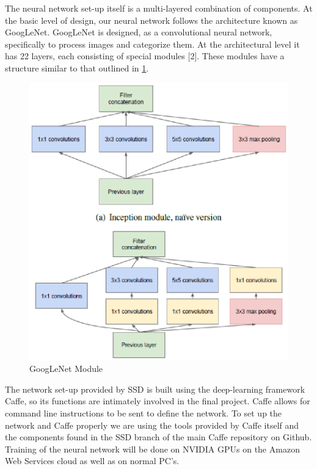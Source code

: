 The neural network set-up itself is a multi-layered combination of components. At the basic level of design, our neural
network follows the architecture known as GoogLeNet. GoogLeNet is designed, as a convolutional neural network,
specifically to process images and categorize them. At the architectural level it has 22 layers, each consisting of special
modules [2]. These modules have a structure similar to that outlined in \ref{fig:4.1}.
\newline
\newline
\begin{figure}
  \includegraphics{GoogLeNetModule.eps}
  \caption{GoogLeNet Module}
  \label{fig:4.1}
\end{figure}The network set-up provided by SSD is built using the deep-learning framework Caffe, so its functions are intimately involved in the final project.
Caffe allows for command line instructions to be sent to define the network.
To set up the network and Caffe properly we are using the tools provided by Caffe itself and the components found in the SSD branch of the main Caffe repository on Github.
\newline
\newline
Training of the neural network will be done on NVIDIA GPUs on the Amazon Web Services cloud as well as on normal PC's.
